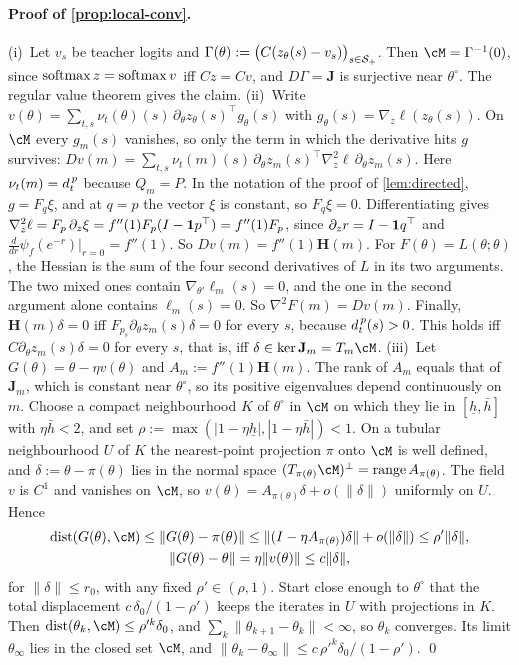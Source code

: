 \paragraph{Proof of \cref{prop:local-conv}.}
(i)~Let $v_s$ be teacher logits and $\Gamma(\theta):=\big(C(z_\theta(s)-v_s)\big)_{s\in\mathcal{S}_+}$. Then $\cM=\Gamma^{-1}(0)$, since $\operatorname{softmax} z=\operatorname{softmax} v$ iff $Cz=Cv$, and
$D\Gamma=\mathbf J$ is surjective near $\theta^\circ$. The regular value theorem gives the claim.
(ii)~Write $v(\theta)=\sum_{t,s}\nu_t(\theta)(s)\,\partial_\theta z_\theta(s)^\top g_\theta(s)$ with $g_\theta(s)=\nabla_z\ell(z_\theta(s))$. On $\cM$ every $g_m(s)$ vanishes, so only
the term in which the derivative hits $g$ survives:
$Dv(m)=\sum_{t,s}\nu_t(m)(s)\,\partial_\theta z_m(s)^\top\nabla^2_z\ell\,\partial_\theta z_m(s)$. Here $\nu_t(m)=d^{\,p}_{t}$ because $Q_m=P$. In the notation of the
proof of \cref{lem:directed}, $g=F_q\xi$, and at $q=p$ the vector $\xi$ is constant, so $F_q\xi=0$. Differentiating gives
$\nabla^2_z\ell=F_p\,\partial_z\xi=f''(1)F_p(I-\mathbf{1} p^\top)=f''(1)F_p$, since $\partial_z r=I-\mathbf{1} q^\top$ and $\frac{d}{dr}\psi_f(e^{-r})|_{r=0}=f''(1)$. So
$Dv(m)=f''(1)\mathbf H(m)$. For $F(\theta)=L(\theta;\theta)$, the Hessian is the sum of the four second derivatives of $L$ in its two arguments.
The two mixed ones contain $\nabla_{\theta'}\ell_m(s)=0$, and the one in the second argument alone contains $\ell_m(s)=0$. So $\nabla^2F(m)=Dv(m)$. Finally, $\mathbf H(m)\delta=0$
iff $F_{p_s}\partial_\theta z_m(s)\delta=0$ for every $s$, because $d^{\,p}_{t}(s)>0$. This holds iff $C\partial_\theta z_m(s)\delta=0$ for every $s$, that is, iff $\delta\in\ker\mathbf J_m=T_m\cM$.
(iii)~Let $G(\theta)=\theta-\eta v(\theta)$ and $A_m:=f''(1)\mathbf H(m)$. The rank of $A_m$ equals that of $\mathbf J_m$, which is constant near $\theta^\circ$, so its positive
eigenvalues depend continuously on $m$. Choose a compact neighbourhood $K$ of $\theta^\circ$ in $\cM$ on which they lie in $[\underline h,\bar h]$ with
$\eta\bar h<2$, and set $\rho:=\max(|1-\eta\underline h|,|1-\eta\bar h|)<1$. On a tubular neighbourhood $U$ of $K$ the nearest-point projection $\pi$ onto $\cM$ is
well defined, and $\delta:=\theta-\pi(\theta)$ lies in the normal space $(T_{\pi(\theta)}\cM)^\perp=\operatorname{range}A_{\pi(\theta)}$. The field $v$ is $C^1$ and vanishes on $\cM$,
so $v(\theta)=A_{\pi(\theta)}\delta+o(\|\delta\|)$ uniformly on $U$. Hence
\begin{gather*}
\operatorname{dist}(G(\theta),\cM)\le\|G(\theta)-\pi(\theta)\|\le\|(I-\eta A_{\pi(\theta)})\delta\|+o(\|\delta\|)\le\rho'\|\delta\|,\\
\|G(\theta)-\theta\|=\eta\|v(\theta)\|\le c\|\delta\|,
\end{gather*}
for $\|\delta\|\le r_0$, with any fixed $\rho'\in(\rho,1)$. Start close enough to $\theta^\circ$ that the total displacement $c\,\delta_0/(1-\rho')$ keeps the iterates in $U$
with projections in $K$. Then $\operatorname{dist}(\theta_k,\cM)\le\rho'^k\delta_0$, and $\sum_k\|\theta_{k+1}-\theta_k\|<\infty$, so $\theta_k$ converges. Its limit $\theta_\infty$ lies in the closed set
$\cM$, and $\|\theta_k-\theta_\infty\|\le c\,\rho'^k\delta_0/(1-\rho')$. \qed

